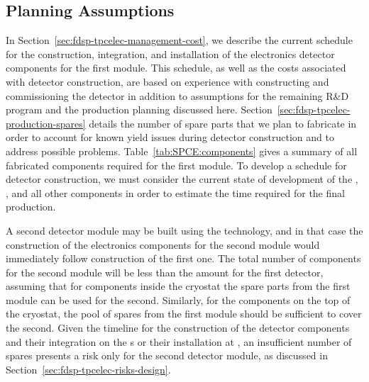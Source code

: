 \subsection{Planning Assumptions}
\label{sec:fdsp-tpcelec-management-planning}

In Section~\ref{sec:fdsp-tpcelec-management-cost}, we describe
the current schedule for the construction, integration, and installation
of the  electronics detector components for the first  
 module. This schedule, as well as the costs associated
with detector construction, are based on experience with constructing
and commissioning the 
detector in addition to assumptions for the remaining R\&D program
and the production planning discussed here. 
Section~\ref{sec:fdsp-tpcelec-production-spares} details
the number of spare parts that we plan to fabricate in order to
account for known yield issues during detector construction
and to address possible problems. Table~\ref{tab:SPCE:components}
gives a summary of all fabricated components required for the first 
 module. To develop a schedule for detector construction, 
we must consider the current state of development of 
the , , and all other components in order to 
estimate the time required for the final production.

A second detector module may be built using the  technology, 
and in that case the construction of the  electronics components 
for the second module would immediately follow construction of 
the first one. The total number of components for the second 
module will be less than the amount for the first detector, assuming that 
for components inside the cryostat the spare parts from the first 
module can be used for the second. Similarly, for the 
components on the top of the cryostat, the pool of spares from the 
first module should be sufficient to cover the second.
Given the timeline for the construction of the detector components
and their integration on the s or their installation at
, an insufficient number of spares presents a risk only
for the second detector module, as discussed in Section~\ref{sec:fdsp-tpcelec-risks-design}.

